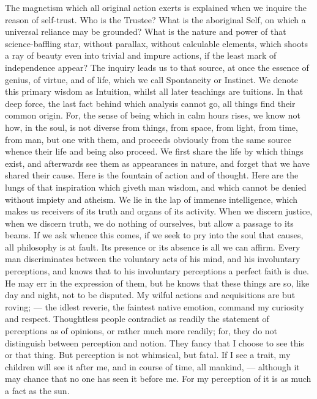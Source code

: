 \documentclass{article}
\begin{document}
The magnetism which all original action exerts is explained when we inquire
the reason of self-trust. Who is the Trustee? What is the aboriginal Self,
on which a universal reliance may be grounded? What is the nature and power
of that science-baffling star, without parallax, without calculable
elements, which shoots a ray of beauty even into trivial and impure actions,
if the least mark of independence appear? The inquiry leads us to that
source, at once the essence of genius, of virtue, and of life, which we call
Spontaneity or Instinct. We denote this primary wisdom as Intuition, whilst
all later teachings are tuitions. In that deep force, the last fact behind
which analysis cannot go, all things find their common origin. For, the
sense of being which in calm hours rises, we know not how, in the soul, is
not diverse from things, from space, from light, from time, from man, but
one with them, and proceeds obviously from the same source whence their life
and being also proceed. We first share the life by which things exist, and
afterwards see them as appearances in nature, and forget that we have shared
their cause. Here is the fountain of action and of thought. Here are the
lungs of that inspiration which giveth man wisdom, and which cannot be
denied without impiety and atheism. We lie in the lap of immense
intelligence, which makes us receivers of its truth and organs of its
activity. When we discern justice, when we discern truth, we do nothing of
ourselves, but allow a passage to its beams. If we ask whence this comes, if
we seek to pry into the soul that causes, all philosophy is at fault. Its
presence or its absence is all we can affirm. Every man discriminates
between the voluntary acts of his mind, and his involuntary perceptions, and
knows that to his involuntary perceptions a perfect faith is due. He may err
in the expression of them, but he knows that these things are so, like day
and night, not to be disputed. My wilful actions and acquisitions are but
roving; --- the idlest reverie, the faintest native emotion, command my
curiosity and respect. Thoughtless people contradict as readily the
statement of perceptions as of opinions, or rather much more readily; for,
they do not distinguish between perception and notion. They fancy that I
choose to see this or that thing. But perception is not whimsical, but
fatal. If I see a trait, my children will see it after me, and in course of
time, all mankind, --- although it may chance that no one has seen it before
me. For my perception of it is as much a fact as the sun.
\end{document}
